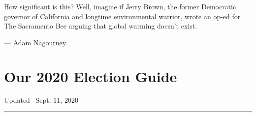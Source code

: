 How significant is this? Well, imagine if Jerry Brown, the former
Democratic governor of California and longtime environmental warrior,
wrote an op-ed for The Sacramento Bee arguing that global warming
doesn't exist.

--- \href{https://www.nytimes3xbfgragh.onion/by/adam-nagourney}{Adam
Nagourney}

\hypertarget{our-2020-election-guide}{%
\section{Our 2020 Election Guide}\label{our-2020-election-guide}}

Updated ~Sept. 11, 2020

\begin{center}\rule{0.5\linewidth}{\linethickness}\end{center}

